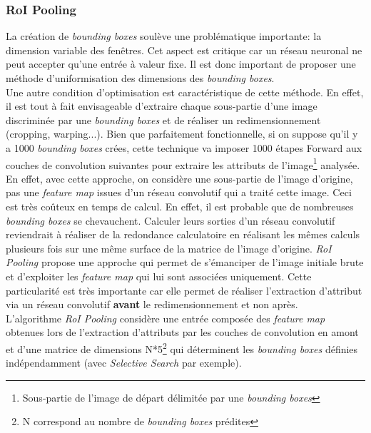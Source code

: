 \subsubsection{RoI Pooling}

La création de \textit{bounding boxes} soulève une problématique importante: la dimension variable des fenêtres. Cet aspect est critique car un réseau neuronal ne peut accepter qu'une entrée à valeur fixe. Il est donc important de proposer une méthode d'uniformisation des dimensions des \textit{bounding boxes}. \\

\noindent Une autre condition d'optimisation est caractéristique de cette méthode. En effet, il est tout à fait envisageable d'extraire chaque sous-partie d'une image discriminée par une \textit{bounding boxes} et de réaliser un redimensionnement (cropping, warping...). Bien que parfaitement fonctionnelle, si on suppose qu'il y a 1000 \textit{bounding boxes} crées, cette technique va imposer 1000 étapes Forward aux couches de convolution suivantes pour extraire les attributs de l'image\footnote{Sous-partie de l'image de départ délimitée par une \textit{bounding boxes}} analysée. En effet, avec cette approche, on considère une sous-partie de l'image d'origine, pas une \textit{feature map} issues d'un réseau convolutif qui a traité cette image. Ceci est très coûteux en temps de calcul. En effet, il est probable que de nombreuses \textit{bounding boxes} se chevauchent. Calculer leurs sorties d'un réseau convolutif reviendrait à réaliser de la redondance calculatoire en réalisant les mêmes calculs plusieurs fois sur une même surface de la matrice de l'image d'origine. \textit{RoI Pooling} propose une approche qui permet de s'émanciper de l'image initiale brute et d'exploiter les \textit{feature map} qui lui sont associées uniquement. Cette particularité est très importante car elle permet de réaliser l'extraction d'attribut via un réseau convolutif \textbf{avant} le redimensionnement et non après.\\

\noindent L'algorithme \textit{RoI Pooling} considère une entrée composée des \textit{feature map} obtenues lors de l'extraction d'attributs par les couches de convolution en amont et d'une matrice de dimensions N*5\footnote{N correspond au nombre de \textit{bounding boxes} prédites} qui déterminent les \textit{bounding boxes} définies indépendamment (avec \textit{Selective Search} par exemple).\\

